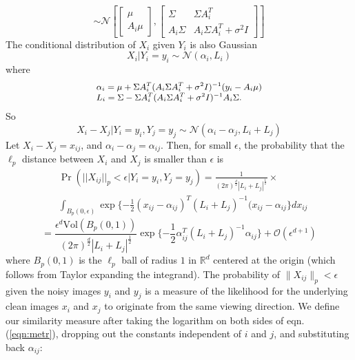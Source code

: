 \documentclass{article}
\begin{document}
\begin{equation}
 \sim \mathcal{N} \left[\begin{bmatrix} \mu \\ A_i \mu \end{bmatrix}, \begin{bmatrix} \Sigma & \Sigma A_i^T \\ A_i \Sigma & A_i \Sigma A_i^T + \sigma^2 I \end{bmatrix} \right]
\end{equation}
\noindent
The conditional distribution of $X_i$ given $Y_i$ is also Gaussian 
 \begin{equation}
  {X_i|Y_i} = y_i \sim \mathcal{N}(\alpha_i, L_i)
 \end{equation}
where 
\begin{equation}
\small{
\begin{array}{l}\alpha_i = \mu + \Sigma A_i^T (A_i \Sigma A_i^T + \sigma^2 I)^{-1} (y_i - A_i \mu) \\ L_i = \Sigma - \Sigma A_i^T (A_i \Sigma A_i^T + \sigma^2 I)^{-1} A_i \Sigma .
       \end{array}}  
\end{equation}
So
\begin{equation}
X_i - X_j|Y_i=y_i, Y_j=y_j \sim \mathcal{N}(\alpha_i-\alpha_j, L_i+L_j)
\end{equation}
Let $X_i - X_j = x_{ij}$, and $\alpha_i -\alpha_j=\alpha_{ij}$. Then, for small $\epsilon$, the probability that the $\ell_p$ distance between $X_i$ and $X_j$ is smaller than $\epsilon$ is
\begin{align}
&\Pr(||X_{ij}||_{p} < \epsilon|Y_i=y_i,Y_j=y_j)   \nonumber
										=   \frac{1}{(2 \pi)^{\frac{d}{2}} |L_{i}+L_{j}|^ \frac{1}{2}} \times \\ 
										& \int_{B_p(0,\epsilon) }^{}\exp \{ -\frac{1}{2}(x_{ij} - \alpha_{ij})^T(L_i+L_j)^{-1}(x_{ij} - \alpha_{ij}\}dx_{ij} 
\end{align}
\begin{equation}
= \frac{\epsilon^d \text{Vol}(B_p(0,1)) }{(2 \pi)^{\frac{d}{2}} |L_i + L_j|^{\frac{1}{2}}} \exp\{-\frac{1}{2}\alpha_{ij}^T(L_i+L_j)^{-1}\alpha_{ij}\} +  \mathcal{O}(\epsilon^{d+1}) 
\label{eqn:metr}
\end{equation}
where $B_p(0,1)$ is the $\ell_p$ ball of radius $1$ in $\mathbb{R}^d$ centered at the origin (which follows from Taylor expanding the integrand). The probability of $\|X_{ij}\|_p < \epsilon$ given the noisy images $y_i$ and $y_j$  is a measure of the likelihood for the underlying clean images $x_i$ and $x_j$ to originate from the same viewing direction. We define our similarity measure after taking the logarithm on both sides of eqn.(\ref{eqn:metr}), dropping out the constants independent of $i$ and $j$, and substituting back $\alpha_{ij}$:
\end{document}
